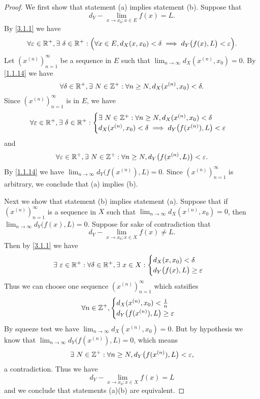 \begin{proof}
  We first show that statement (a) implies statement (b).
  Suppose that
  \[
    d_Y - \lim_{x \to x_0 ; x \in E} f(x) = L.
  \]
  By \cref{3.1.1} we have
  \[
    \forall \varepsilon \in \mathbb{R}^+, \exists\ \delta \in \mathbb{R}^+ : \Big(\forall x \in E, d_X(x, x_0) < \delta \implies d_Y\big(f(x), L\big) < \varepsilon\Big).
  \]
  Let \((x^{(n)})_{n = 1}^\infty\) be a sequence in \(E\) such that \(\lim_{n \to \infty} d_X(x^{(n)}, x_0) = 0\).
  By \cref{1.1.14} we have
  \[
    \forall \delta \in \mathbb{R}^+, \exists\ N \in \mathbb{Z}^+ : \forall n \geq N, d_X(x^{(n)}, x_0) < \delta.
  \]
  Since \((x^{(n)})_{n = 1}^\infty\) is in \(E\), we have
  \[
    \forall \varepsilon \in \mathbb{R}^+, \exists\ \delta \in \mathbb{R}^+ : \begin{cases}
      \exists\ N \in \mathbb{Z}^+ : \forall n \geq N, d_X(x^{(n)}, x_0) < \delta \\
      d_X(x^{(n)}, x_0) < \delta \implies d_Y\big(f(x^{(n)}), L\big) < \varepsilon
    \end{cases}
  \]
  and
  \[
    \forall \varepsilon \in \mathbb{R}^+, \exists\ N \in \mathbb{Z}^+ : \forall n \geq N, d_Y\big(f(x^{(n)}, L)\big) < \varepsilon.
  \]
  By \cref{1.1.14} we have \(\lim_{n \to \infty} d_Y\big(f(x^{(n)}), L\big) = 0\).
  Since \((x^{(n)})_{n = 1}^\infty\) is arbitrary, we conclude that (a) implies (b).

  Next we show that statement (b) implies statement (a).
  Suppose that if \((x^{(n)})_{n = 1}^\infty\) is a sequence in \(X\) such that \(\lim_{n \to \infty} d_X(x^{(n)}, x_0) = 0\), then \(\lim_{n \to \infty} d_Y\big(f(x), L\big) = 0\).
  Suppose for sake of contradiction that
  \[
    d_Y - \lim_{x \to x_0 ; x \in X} f(x) \neq L.
  \]
  Then by \cref{3.1.1} we have
  \[
    \exists\ \varepsilon \in \mathbb{R}^+ : \forall \delta \in \mathbb{R}^+, \exists\ x \in X : \begin{cases}
      d_X(x, x_0) < \delta \\
      d_Y\big(f(x), L\big) \geq \varepsilon
    \end{cases}
  \]
  Thus we can choose one sequence \((x^{(n)})_{n = 1}^\infty\) which satsifies
  \[
    \forall n \in \mathbb{Z}^+, \begin{cases}
      d_X(x^{(n)}, x_0) < \frac{1}{n} \\
      d_Y\big(f(x^{(n)}), L\big) \geq \varepsilon
    \end{cases}
  \]
  By squeeze test we have \(\lim_{n \to \infty} d_X(x^{(n)}, x_0) = 0\).
  But by hypothesis we know that \(\lim_{n \to \infty} d_Y\big(f(x^{(n)}), L\big) = 0\), which means
  \[
    \exists\ N \in \mathbb{Z}^+ : \forall n \geq N, d_Y\big(f(x^{(n)}), L\big) < \varepsilon,
  \]
  a contradiction.
  Thus we have
  \[
    d_Y - \lim_{x \to x_0 ; x \in X} f(x) = L
  \]
  and we conclude that statements (a)(b) are equivalent.


\end{proof}
